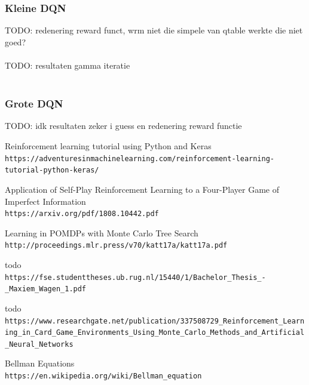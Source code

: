 \documentclass[11pt]{article}
\begin{document}
\subsubsection{Kleine DQN}
TODO: redenering reward funct, wrm niet die simpele van qtable werkte die niet goed?\\\\
TODO: resultaten gamma iteratie\\\\

\subsubsection{Grote DQN}
TODO: idk resultaten zeker i guess en redenering reward functie\\


\begin{thebibliography}{9}
Reinforcement learning tutorial using Python and Keras 
\\\texttt{https://adventuresinmachinelearning.com/reinforcement-learning-tutorial-python-keras/}

Application of Self-Play Reinforcement Learning to a Four-Player Game of Imperfect Information
\\\texttt{https://arxiv.org/pdf/1808.10442.pdf}

Learning in POMDPs with Monte Carlo Tree Search
\\\texttt{http://proceedings.mlr.press/v70/katt17a/katt17a.pdf}

todo
\\\texttt{https://fse.studenttheses.ub.rug.nl/15440/1/Bachelor\_Thesis\_-\_Maxiem\_Wagen\_1.pdf}

todo
\\\texttt{https://www.researchgate.net/publication/337508729\_Reinforcement\_Learning\_in\_Card\_Game\_Environments\_Using\_Monte\_Carlo\_Methods\_and\_Artificial\_Neural\_Networks}

Bellman Equations
\\\texttt{https://en.wikipedia.org/wiki/Bellman\_equation}
\end{thebibliography}
\end{document}
